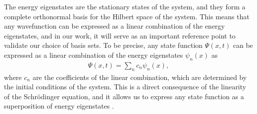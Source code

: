\documentclass{subfiles}
\begin{document}
The energy eigenstates are the stationary states of the system, and they form a complete orthonormal basis for the Hilbert space of the system. This means that any wavefunction can be expressed as a linear combination of the energy eigenstates, and in our work, it will serve as an important reference point to validate our choice of basis sets. To be precise, any state function $\Psi(x, t)$ can be expressed as a linear combination of the energy eigenstates $\psi_n(x)$ as
\begin{align*}
    \Psi(x, t) = \sum_n c_n\psi_n(x),
\end{align*}
where $c_n$ are the coefficients of the linear combination, which are determined by the initial conditions of the system. This is a direct consequence of the linearity of the Schrödinger equation, and it allows us to express any state function as a superposition of energy eigenstates \cite{griffiths2018introduction, berera2021quantum}.
\end{document}
